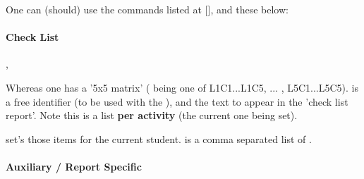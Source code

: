 \documentclass[article,nofontwarning,nogeometry,english,tocdepth=3,secdepth=3]{ufrgscca} %
\begin{document}
One can (should) use the commands listed at [], and these below:

\paragraph{Check List}
\begin{codedescribe}[code,update=2023/11/18]{\checkdef,\checklist}%
\begin{codesyntax}%
\end{codesyntax}
Whereas one has a '5x5 matrix' ( being one of L1C1...L1C5, ... , L5C1...L5C5).  is a free identifier (to be used with the \tsmacro{\checklist}{}), and  the text to appear in the 'check list report'.  Note this is a list \textbf{per activity} (the current one being set).

\tsmacro{\checklist}{} set's those items for the current student.  is a comma separated list of .

\begin{codestore}[st=d.check]


\end{codestore}



\end{codedescribe}


\paragraph{Auxiliary / Report Specific}
\end{document}
